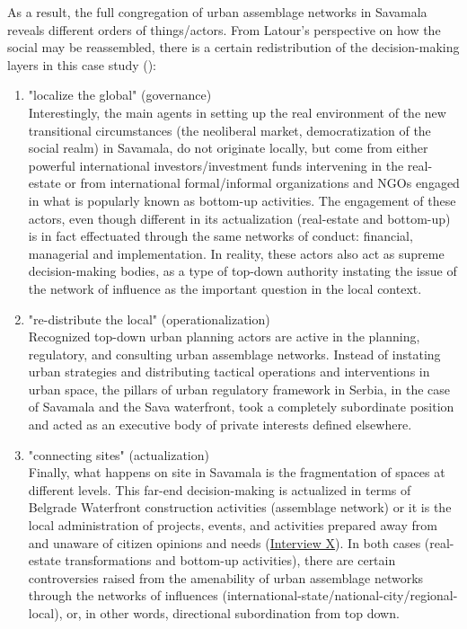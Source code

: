 \documentclass[11pt]{report}
\begin{document}
{{{{As a result, the full congregation of urban assemblage networks in Savamala reveals different orders of things/actors. From Latour’s perspective on how the social may be reassembled, there is a certain redistribution of the decision-making layers in this case study (\href{Latour}{\citealt{latour_reassembling_2005}}):

\begin{enumerate}
\item "localize the global" (governance)
\\
Interestingly, the main agents in setting up the real environment of the new transitional circumstances (the neoliberal market, democratization of the social realm) in Savamala, do not originate locally, but come from either powerful international investors/investment funds intervening in the real-estate or from international formal/informal organizations and NGOs engaged in what is popularly known as bottom-up activities. The engagement of these actors, even though different in its actualization (real-estate and bottom-up) is in fact effectuated through the same networks of conduct: financial, managerial and implementation. In reality, these actors also act as supreme decision-making bodies, as a type of top-down authority instating the issue of the network of influence as the important question in the local context. 

\item "re-distribute the local" (operationalization)
\\
Recognized top-down urban planning actors are active in the planning, regulatory, and consulting urban assemblage networks. Instead of instating urban strategies and distributing tactical operations and interventions in urban space, the pillars of urban regulatory framework in Serbia, in the case of Savamala and the Sava waterfront, took a completely subordinate position and acted as an executive body of private interests defined elsewhere.

\item "connecting sites" (actualization)
\\
Finally, what happens on site in Savamala is the fragmentation of spaces at different levels. This far-end decision-making is actualized in terms of Belgrade Waterfront construction activities (assemblage network) or it is the local administration of projects, events, and activities prepared away from and unaware of citizen opinions and needs (\href{InterviewX}{Interview X}).
In both cases (real-estate transformations and bottom-up activities), there are certain controversies raised from the amenability of urban assemblage networks through the networks of influences (international-state/national-city/regional-local), or, in other words, directional subordination from top down.
\end{enumerate}

}}}}
\end{document}
